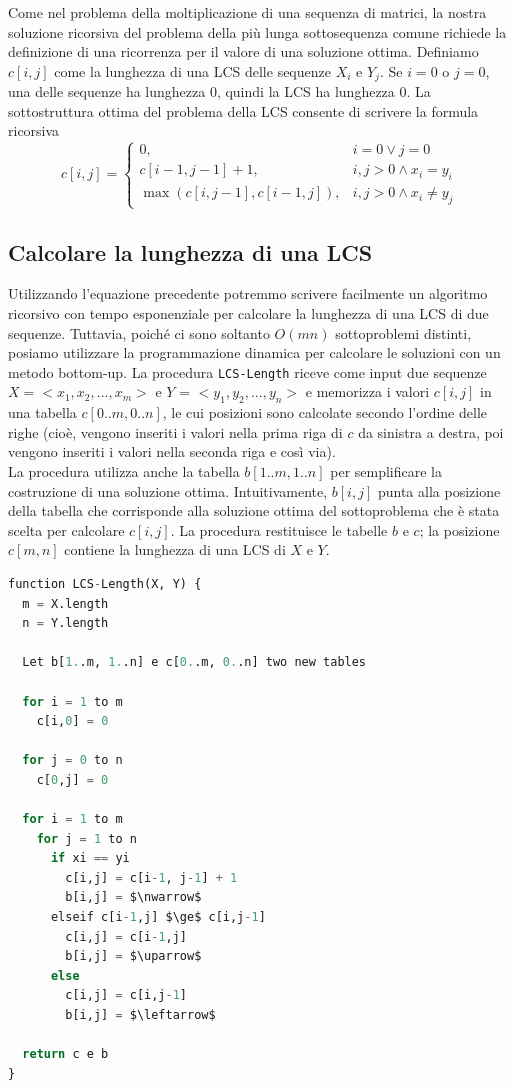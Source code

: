 Come nel problema della moltiplicazione di una sequenza di matrici, la
nostra soluzione ricorsiva del problema della più lunga sottosequenza
comune richiede la definizione di una ricorrenza per il valore di una
soluzione ottima. Definiamo $c[i,j]$ come la lunghezza di una LCS
delle sequenze $X_i$ e $Y_j$. Se $i = 0$ o $j = 0$, una delle
sequenze ha lunghezza 0, quindi la LCS ha lunghezza 0. La sottostruttura
ottima del problema della LCS consente di scrivere la formula ricorsiva\\

$$
  c[i,j]= \begin{cases}
    0,                          & i = 0 \vee j = 0            \\
    c[i-1, j-1] + 1,            & i, j > 0 \wedge x_i = y_i   \\
    \max(c[i, j-1], c[i-1, j]), & i,j > 0 \wedge x_i \neq y_j
  \end{cases}
$$

\subsection{Calcolare la lunghezza di una LCS}

Utilizzando l'equazione precedente potremmo scrivere facilmente un
algoritmo ricorsivo con tempo esponenziale per calcolare la lunghezza di
una LCS di due sequenze. Tuttavia, poiché ci sono soltanto $O(mn)$
sottoproblemi distinti, posiamo utilizzare la programmazione dinamica
per calcolare le soluzioni con un metodo bottom-up. La procedura
\texttt{LCS-Length} riceve come input due sequenze
$X = <x_1, x_2, ..., x_m>$ e $Y$ = $<y_1, y_2, ..., y_n>$ e
memorizza i valori $c[i,j]$ in una tabella $c[0..m, 0..n]$, le cui
posizioni sono calcolate secondo l'ordine delle righe (cioè, vengono
inseriti i valori nella prima riga di $c$ da sinistra a destra, poi
vengono inseriti i valori nella seconda riga e così via).\\

La procedura utilizza anche la tabella $b[1..m, 1..n]$ per
semplificare la costruzione di una soluzione ottima. Intuitivamente,
$b[i, j]$ punta alla posizione della tabella che corrisponde alla
soluzione ottima del sottoproblema che è stata scelta per calcolare
$c[i,j]$. La procedura restituisce le tabelle $b$ e $c$; la
posizione $c[m,n]$ contiene la lunghezza di una LCS di $X$ e $Y$.\\

\begin{lstlisting}[language=Python, mathescape=true]
function LCS-Length(X, Y) {
  m = X.length
  n = Y.length

  Let b[1..m, 1..n] e c[0..m, 0..n] two new tables

  for i = 1 to m
    c[i,0] = 0

  for j = 0 to n
    c[0,j] = 0

  for i = 1 to m
    for j = 1 to n
      if xi == yi
        c[i,j] = c[i-1, j-1] + 1
        b[i,j] = $\nwarrow$
      elseif c[i-1,j] $\ge$ c[i,j-1]
        c[i,j] = c[i-1,j]
        b[i,j] = $\uparrow$
      else 
        c[i,j] = c[i,j-1] 
        b[i,j] = $\leftarrow$

  return c e b
}
\end{lstlisting}

